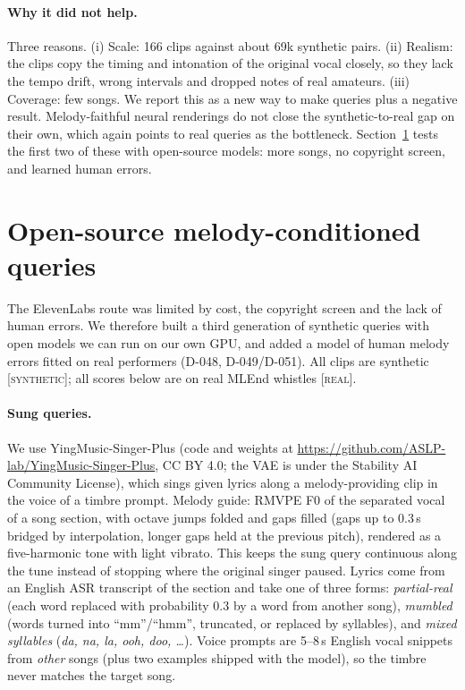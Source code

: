 \documentclass[11pt]{article}
\newcommand{\syn}{\textsc{[synthetic]}}
\newcommand{\real}{\textsc{[real]}}
\begin{document}
\paragraph{Why it did not help.} Three reasons. (i) Scale: 166 clips against about 69k synthetic pairs. (ii) Realism: the clips copy the timing and intonation of the original vocal closely, so they lack the tempo drift, wrong intervals and dropped notes of real amateurs. (iii) Coverage: few songs. We report this as a new way to make queries plus a negative result. Melody-faithful neural renderings do not close the synthetic-to-real gap on their own, which again points to real queries as the bottleneck. Section~\ref{sec:oss} tests the first two of these with open-source models: more songs, no copyright screen, and learned human errors.

\section{Open-source melody-conditioned queries}\label{sec:oss}
The ElevenLabs route was limited by cost, the copyright screen and the lack of human errors. We therefore built a third generation of synthetic queries with open models we can run on our own GPU, and added a model of human melody errors fitted on real performers (D-048, D-049/D-051). All clips are synthetic \syn; all scores below are on real MLEnd whistles \real.

\paragraph{Sung queries.} We use YingMusic-Singer-Plus \citep{yingmusic2026} (code and weights at \url{https://github.com/ASLP-lab/YingMusic-Singer-Plus}, CC BY 4.0; the VAE is under the Stability AI Community License), which sings given lyrics along a melody-providing clip in the voice of a timbre prompt. Melody guide: RMVPE F0 of the separated vocal of a song section, with octave jumps folded and gaps filled (gaps up to 0.3\,s bridged by interpolation, longer gaps held at the previous pitch), rendered as a five-harmonic tone with light vibrato. This keeps the sung query continuous along the tune instead of stopping where the original singer paused. Lyrics come from an English ASR transcript of the section and take one of three forms: \emph{partial-real} (each word replaced with probability 0.3 by a word from another song), \emph{mumbled} (words turned into ``mm''/``hmm'', truncated, or replaced by syllables), and \emph{mixed syllables} (\emph{da, na, la, ooh, doo, \ldots}). Voice prompts are 5--8\,s English vocal snippets from \emph{other} songs (plus two examples shipped with the model), so the timbre never matches the target song.
\end{document}
